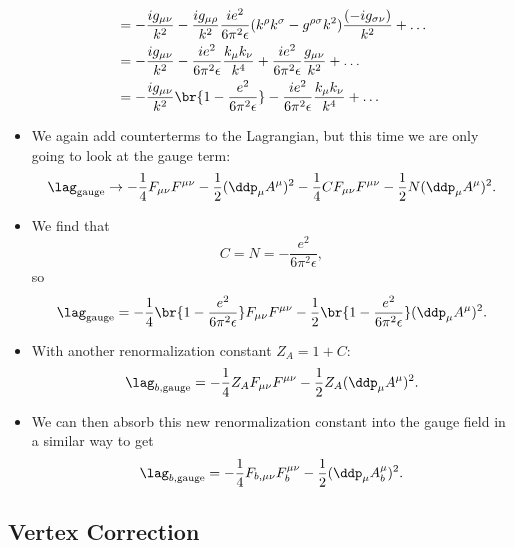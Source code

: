 \begin{itemize}
\begin{align}
            &= -\frac{ig_{\mu\nu}}{k^2} - \frac{ig_{\mu\rho}}{k^2} \frac{ie^2}{6\pi^2\epsilon}(k^{\rho}k^{\sigma} - g^{\rho\sigma}k^2)\frac{(-ig_{\sigma\nu})}{k^2} + \ldots \\
            &= -\frac{ig_{\mu\nu}}{k^2} - \frac{ie^2}{6\pi^2\epsilon}\frac{k_{\mu}k_{\nu}}{k^4} + \frac{ie^2}{6\pi^2\epsilon}\frac{g_{\mu\nu}}{k^2} + \ldots \\
            &= -\frac{ig_{\mu\nu}}{k^2} \br{1 - \frac{e^2}{6\pi^2\epsilon}} - \frac{ie^2}{6\pi^2\epsilon}\frac{k_{\mu}k_{\nu}}{k^4} + \ldots
        \end{align}
    \item We again add counterterms to the Lagrangian, but this time we are only going to look at the gauge term:
        \begin{equation}
            \lag_{\mathrm{gauge}} \rightarrow -\frac{1}{4}F_{\mu\nu}F^{\mu\nu} - \frac{1}{2}(\ddp_{\mu}A^{\mu})^2 - \frac{1}{4}CF_{\mu\nu}F^{\mu\nu} - \frac{1}{2}N(\ddp_{\mu}A^{\mu})^2.
        \end{equation}
    \item We find that 
        \begin{equation}
            C = N = -\frac{e^2}{6\pi^2\epsilon},
        \end{equation}
        so
        \begin{equation}
            \lag_{\mathrm{gauge}} = -\frac{1}{4}\br{1 - \frac{e^2}{6\pi^2\epsilon}}F_{\mu\nu}F^{\mu\nu} - \frac{1}{2}\br{1 - \frac{e^2}{6\pi^2\epsilon}}(\ddp_{\mu}A^{\mu})^2.
        \end{equation}
    \item With another renormalization constant $Z_A = 1+C$:
        \begin{equation}
            \lag_{b,\mathrm{gauge}} = -\frac{1}{4}Z_AF_{\mu\nu}F^{\mu\nu} - \frac{1}{2}Z_A(\ddp_{\mu}A^{\mu})^2.
        \end{equation}
    \item We can then absorb this new renormalization constant into the gauge field in a similar way to get
        \begin{equation}
            \lag_{b,\mathrm{gauge}} = -\frac{1}{4}F_{b,\mu\nu}F_b^{\mu\nu} - \frac{1}{2}(\ddp_{\mu}A_b^{\mu})^2.
        \end{equation}
\end{itemize}


\subsection*{Vertex Correction}

